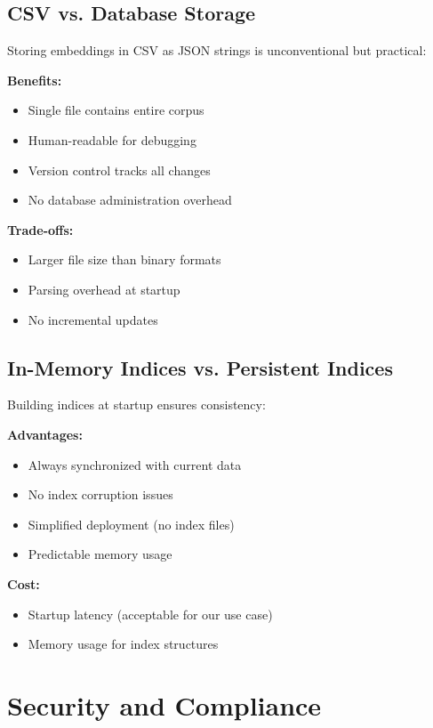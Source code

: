 \subsection{CSV vs. Database Storage}

Storing embeddings in CSV as JSON strings is unconventional but practical:

\textbf{Benefits:}
\begin{itemize}[leftmargin=*,itemsep=2pt,topsep=2pt]
  \item Single file contains entire corpus
  \item Human-readable for debugging
  \item Version control tracks all changes
  \item No database administration overhead
\end{itemize}

\textbf{Trade-offs:}
\begin{itemize}[leftmargin=*,itemsep=2pt,topsep=2pt]
  \item Larger file size than binary formats
  \item Parsing overhead at startup
  \item No incremental updates
\end{itemize}

\subsection{In-Memory Indices vs. Persistent Indices}

Building indices at startup ensures consistency:

\textbf{Advantages:}
\begin{itemize}[leftmargin=*,itemsep=2pt,topsep=2pt]
  \item Always synchronized with current data
  \item No index corruption issues
  \item Simplified deployment (no index files)
  \item Predictable memory usage
\end{itemize}

\textbf{Cost:}
\begin{itemize}[leftmargin=*,itemsep=2pt,topsep=2pt]
  \item Startup latency (acceptable for our use case)
  \item Memory usage for index structures
\end{itemize}

\section{Security and Compliance}


